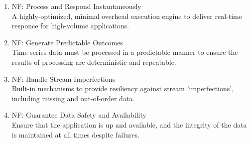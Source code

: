\begin{enumerate}
\item{NF: Process and Respond Instantaneously\\ A highly-optimized, minimal overhead execution engine to deliver real-time responce for 
high-volume applications. }
\item{NF: Generate Predictable Outcomes\\ Time series data must be processed in a predictable manner to ensure the results of processing 
are deterministic and repeatable.} 
\item{NF: Handle Stream Imperfections\\ Built-in mechanisms to provide resiliency against stream 'imperfections', including missing and
out-of-order data.}
\item{NF: Guarantee Data Safety and Availability\\ Ensure that the application is up and available, and the integrity of the data is maintained 
at all times despite failures. }
\end{enumerate}

